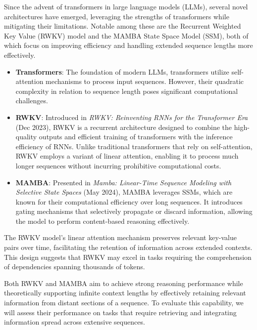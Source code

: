 \documentclass[11pt]{article}
\begin{document}
Since the advent of transformers in large language models (LLMs), several novel architectures have emerged, leveraging the strengths of transformers while mitigating their limitations. Notable among these are the Recurrent Weighted Key Value (RWKV) model and the MAMBA State Space Model (SSM), both of which focus on improving efficiency and handling extended sequence lengths more effectively.

\begin{itemize}
    \item \textbf{Transformers}: The foundation of modern LLMs, transformers utilize self-attention mechanisms to process input sequences. However, their quadratic complexity in relation to sequence length poses significant computational challenges.
    
    \item \textbf{RWKV}: Introduced in \textit{RWKV: Reinventing RNNs for the Transformer Era} (Dec 2023), RWKV is a recurrent architecture designed to combine the high-quality outputs and efficient training of transformers with the inference efficiency of RNNs. Unlike traditional transformers that rely on self-attention, RWKV employs a variant of linear attention, enabling it to process much longer sequences without incurring prohibitive computational costs.
    
    \item \textbf{MAMBA}: Presented in \textit{Mamba: Linear-Time Sequence Modeling with Selective State Spaces} (May 2024), MAMBA leverages SSMs, which are known for their computational efficiency over long sequences. It introduces gating mechanisms that selectively propagate or discard information, allowing the model to perform content-based reasoning effectively.
\end{itemize}

The RWKV model’s linear attention mechanism preserves relevant key-value pairs over time, facilitating the retention of information across extended contexts. This design suggests that RWKV may excel in tasks requiring the comprehension of dependencies spanning thousands of tokens.

Both RWKV and MAMBA aim to achieve strong reasoning performance while theoretically supporting infinite context lengths by effectively retaining relevant information from distant sections of a sequence. To evaluate this capability, we will assess their performance on tasks that require retrieving and integrating information spread across extensive sequences.
\end{document}
